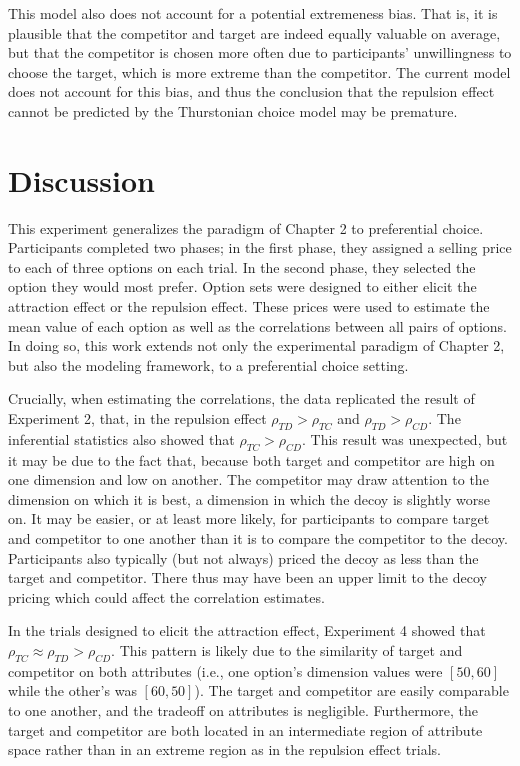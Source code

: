 This model also does not account for a potential extremeness bias. That is, it is plausible that the competitor and target are indeed equally valuable on average, but that the competitor is chosen more often due to participants' unwillingness to choose the target, which is more extreme than the competitor. The current model does not account for this bias, and thus the conclusion that the repulsion effect cannot be predicted by the Thurstonian choice model may be premature.

\section{Discussion}

This experiment generalizes the paradigm of Chapter 2 to preferential choice. Participants completed two phases; in the first phase, they assigned a selling price to each of three options on each trial. In the second phase, they selected the option they would most prefer. Option sets were designed to either elicit the attraction effect or the repulsion effect. These prices were used to estimate the mean value of each option as well as the correlations between all pairs of options. In doing so, this work extends not only the experimental paradigm of Chapter 2, but also the modeling framework, to a preferential choice setting.

Crucially, when estimating the correlations, the data replicated the result of Experiment 2, that, in the repulsion effect $\rho_{TD}>\rho_{TC}$ and $\rho_{TD}>\rho_{CD}$. The inferential statistics also showed that $\rho_{TC}>\rho_{CD}$. This result was unexpected, but it may be due to the fact that, because both target and competitor are high on one dimension and low on another. The competitor may draw attention to the dimension on which it is best, a dimension in which the decoy is slightly worse on. It may be easier, or at least more likely, for participants to compare target and competitor to one another than it is to compare the competitor to the decoy. Participants also typically (but not always) priced the decoy as less than the target and competitor. There thus may have been an upper limit to the decoy pricing which could affect the correlation estimates. 

In the trials designed to elicit the attraction effect, Experiment 4 showed that $\rho_{TC}\approx\rho_{TD}>\rho_{CD}$. This pattern is likely due to the similarity of target and competitor on both attributes (i.e., one option's dimension values were $[50,60]$ while the other's was $[60,50]$). The target and competitor are easily comparable to one another, and the tradeoff on attributes is negligible. Furthermore, the target and competitor are both located in an intermediate region of attribute space rather than in an extreme region as in the repulsion effect trials.

